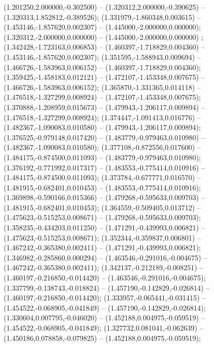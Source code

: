  (1.201250,2.000000,-0.302500) -- (1.320312,2.000000,-0.390625) -- (1.320313,1.852812,-0.389526);
 (1.331979,-1.860348,0.003615) -- (1.453146,-1.857620,0.002307) -- (1.445000,-2.000000,0.000000);
 (1.320312,-2.000000,0.000000) -- (1.445000,-2.000000,0.000000) ;
 (1.342428,-1.723163,0.006853) -- (1.460397,-1.718829,0.004360) -- (1.453146,-1.857620,0.002307);
 (1.351595,-1.588943,0.009694) -- (1.466726,-1.583963,0.006152) -- (1.460397,-1.718829,0.004360);
 (1.359425,-1.458183,0.012121) -- (1.472107,-1.453348,0.007675) -- (1.466726,-1.583963,0.006152);
 (1.365870,-1.331365,0.014118) -- (1.476518,-1.327299,0.008924) -- (1.472107,-1.453348,0.007675);
 (1.370888,-1.208959,0.015673) -- (1.479943,-1.206117,0.009894) -- (1.476518,-1.327299,0.008924);
 (1.374447,-1.091413,0.016776) -- (1.482367,-1.090083,0.010580) -- (1.479943,-1.206117,0.009894);
 (1.376525,-0.979148,0.017420) -- (1.483779,-0.979463,0.010980) -- (1.482367,-1.090083,0.010580);
 (1.377108,-0.872556,0.017600) -- (1.484175,-0.874500,0.011093) -- (1.483779,-0.979463,0.010980);
 (1.376192,-0.771992,0.017317) -- (1.483553,-0.775414,0.010916) -- (1.484175,-0.874500,0.011093);
 (1.373784,-0.677771,0.016570) -- (1.481915,-0.682401,0.010453) -- (1.483553,-0.775414,0.010916);
 (1.369898,-0.590166,0.015366) -- (1.479268,-0.595633,0.009703) -- (1.481915,-0.682401,0.010453);
 (1.364559,-0.509405,0.013712) -- (1.475623,-0.515253,0.008671) -- (1.479268,-0.595633,0.009703);
 (1.358235,-0.434203,0.011250) -- (1.471291,-0.439993,0.006821) -- (1.475623,-0.515253,0.008671);
 (1.352344,-0.359837,0.006801) -- (1.467242,-0.365380,0.002411) -- (1.471291,-0.439993,0.006821);
 (1.346982,-0.285860,0.000294) -- (1.463546,-0.291016,-0.004675) -- (1.467242,-0.365380,0.002411);
 (1.342137,-0.212189,-0.008251) -- (1.460197,-0.216850,-0.014420) -- (1.463546,-0.291016,-0.004675);
 (1.337799,-0.138743,-0.018824) -- (1.457190,-0.142829,-0.026814) -- (1.460197,-0.216850,-0.014420);
 (1.333957,-0.065441,-0.031415) -- (1.454522,-0.068905,-0.041849) -- (1.457190,-0.142829,-0.026814);
 (1.330604,0.007795,-0.046020) -- (1.452188,0.004975,-0.059519) -- (1.454522,-0.068905,-0.041849);
 (1.327732,0.081041,-0.062639) -- (1.450186,0.078858,-0.079825) -- (1.452188,0.004975,-0.059519);
